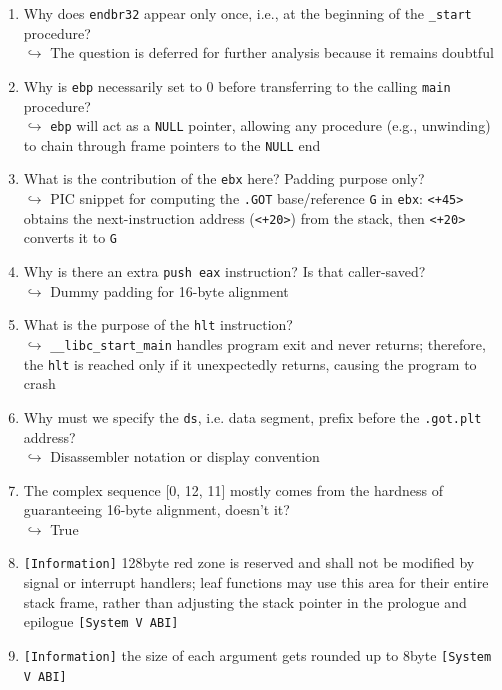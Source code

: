 \documentclass[main.tex]{subfiles}
\begin{document}
\begin{minipage}[t]{0.49\textwidth}
	\setlength{\parskip}{1em}
	\begin{enumerate}
	    \item[\texttt{[1]}] Why does \texttt{endbr32} appear only once, i.e., at the beginning of the \texttt{\_start} procedure? \\
	    $\hookrightarrow$ The question is deferred for further analysis because it remains doubtful
	    \item[\texttt{[1]}] Why is \texttt{ebp} necessarily set to 0 before transferring to the calling \texttt{main} procedure? \\
	    $\hookrightarrow$ \texttt{ebp} will act as a \texttt{NULL} pointer, allowing any procedure (e.g., unwinding) to chain through frame pointers to the \texttt{NULL} end
	    \item[\texttt{[6]}] What is the contribution of the \texttt{ebx} here? Padding purpose only? \\
	    $\hookrightarrow$ PIC snippet for computing the \texttt{.GOT} base/reference \texttt{G} in \texttt{ebx}: \texttt{<+45>} obtains the next-instruction address (\texttt{<+20>}) from the stack, then  \texttt{<+20>} converts it to \texttt{G}
	    \item[\texttt{[4]}] Why is there an extra \texttt{push eax} instruction? Is that caller-saved?  \\
	    $\hookrightarrow$ Dummy padding for 16-byte alignment
	    \item[\texttt{[8]}] What is the purpose of the \texttt{hlt} instruction? \\
	    $\hookrightarrow$ \texttt{\_\_libc\_start\_main} handles program exit and never returns; therefore, the \texttt{hlt} is reached only if it unexpectedly returns, causing the program to crash
	    \item[\texttt{[9]}] Why must we specify the \texttt{ds}, i.e. data segment, prefix before the \texttt{.got.plt} address? \\
		$\hookrightarrow$ Disassembler notation or display convention
		\item[\texttt{[0]}] The complex sequence [0, 12, 11] mostly comes from the hardness of guaranteeing 16-byte alignment, doesn't it? \\
		$\hookrightarrow$ True
		\item[\texttt{[\_]}] \texttt{[Information]} 128byte red zone is reserved and shall not be modified by signal or interrupt handlers; leaf functions may use this area for their entire stack frame, rather than adjusting the stack pointer in the prologue and epilogue \texttt{[System V ABI]}
		\item[\texttt{[\_]}] \texttt{[Information]} the size of each argument gets rounded up to 8byte \texttt{[System V ABI]}
	\end{enumerate}
	

\end{minipage}
\end{document}
